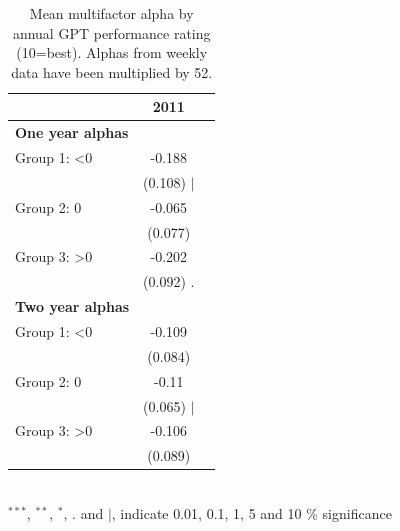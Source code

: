 
\begin{table}[ht]
\centering
\caption{Mean multifactor alpha by annual GPT performance rating (10=best). Alphas from weekly data have been multiplied by 52. 
}
\label{table:results}
\begin{tabular}{lcc}
\toprule
& \textbf {2011} \\
\midrule\addlinespace[0.4mm]
\textbf{One year alphas} & & \\
\quad Group 1: \textless 0 & -0.188 \\
 & (0.108) $|$ \\
\quad Group 2: 0 & -0.065 \\
 & (0.077) \\
\quad Group 3: \textgreater 0 & -0.202 \\
 & (0.092) . \\
\textbf{Two year alphas} & & \\
\quad Group 1: \textless 0 & -0.109 \\
 & (0.084) \\
\quad Group 2: 0 & -0.11 \\
 & (0.065) $|$ \\
\quad Group 3: \textgreater 0 & -0.106 \\
 & (0.089) \\
 
\bottomrule
\end{tabular}
\footnotesize \\
$^{***}$, $^{**}$, $^{*}$, . and $|$, indicate 0.01, 0.1, 1, 5 and 10 \% significance
\end{table}
